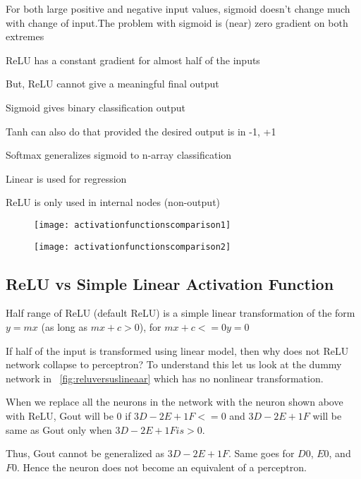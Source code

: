 	\begin{bulletedlist}
		\item For both large positive and negative input values, sigmoid doesn't change much with change of input.The problem with sigmoid is (near) zero gradient on both extremes
		\item ReLU has a constant gradient for almost half of the inputs
		\item But, ReLU cannot give a meaningful final output
		\item Sigmoid gives binary classification output
		\item Tanh can also do that provided the desired output is in {-1, +1}
		\item Softmax generalizes sigmoid to n-array classification
		\item Linear is used for regression
		\item ReLU is only used in internal nodes (non-output)
	\end{bulletedlist}



 	\begin{figure}[h]
		\begin{minipage}[t]{0.48\textwidth}
			\centering
			\texttt{[image: activationfunctionscomparison1]}
		\end{minipage}
		\hfill
		\begin{minipage}[t]{0.48\textwidth}
			\centering
			\texttt{[image: activationfunctionscomparison2]}
		\end{minipage}
		\caption{}
		\label{fig:activationfunctionscomparison}
	\end{figure}


	\subsection{ReLU vs Simple Linear Activation Function}
	\begin{bulletedlist}
		\item Half range of ReLU (default ReLU) is a simple linear transformation of the form $y = mx$ (as long as $mx +c > 0$),
for $mx + c <=0 y = 0$
		\item If half of the input is transformed using linear model, then why does not ReLU network collapse to perceptron?
To understand this let us look at the dummy network in \figurename~\ref{fig:reluversuslineaar} which has no nonlinear transformation.
		\item When we replace all the neurons in the network with the neuron shown above with ReLU, Gout will be 0 if $3D
-2E + 1F < = 0$ and $3D - 2E + 1F$ will be same as Gout only when $3D -2E + 1F is > 0$.
		\item Thus, Gout cannot be generalized as $3D -2E + 1F$. Same goes for $D0$, $E0$, and $F0$. Hence the neuron does not
become an equivalent of a perceptron.
	\end{bulletedlist}

